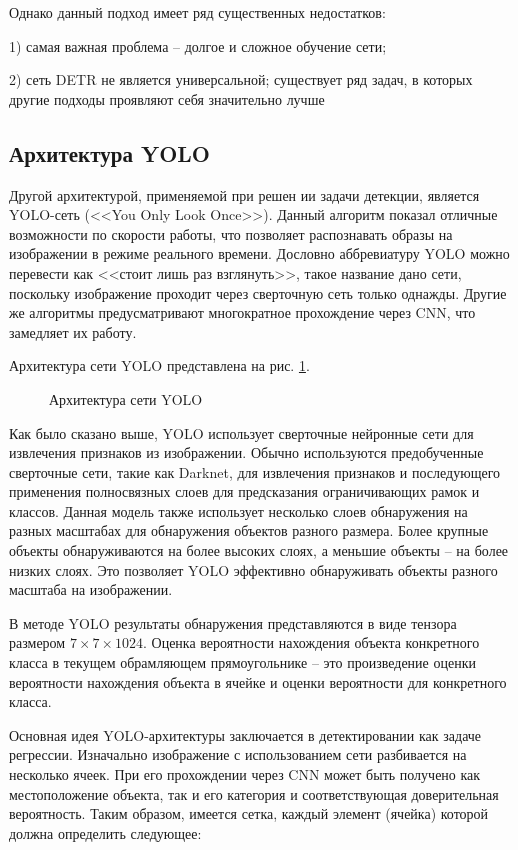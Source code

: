 \documentclass[14pt,a4paper]{extarticle}
\begin{document}
Однако данный подход имеет ряд существенных недостатков:

1) самая важная проблема -- долгое и сложное обучение сети;

2) сеть DETR не является универсальной; существует ряд задач, в которых другие подходы проявляют себя значительно лучше 

\newpage
\subsection{Архитектура YOLO}
Другой архитектурой, применяемой при решен
ии задачи детекции, является YOLO-сеть (<<You Only Look Once>>). Данный алгоритм показал отличные возможности по скорости работы, что позволяет распознавать образы на изображении в режиме реального времени. Дословно аббревиатуру YOLO можно перевести как <<стоит лишь раз взглянуть>>, такое название дано сети, поскольку изображение проходит через сверточную сеть только однажды. Другие же алгоритмы предусматривают многократное прохождение через CNN, что замедляет их работу. 

Архитектура сети YOLO представлена на рис. \ref{yolo}.
\begin{figure}[h]
\caption{Архитектура сети YOLO} \label{yolo}
\end{figure}

Как было сказано выше, YOLO использует сверточные нейронные сети для извлечения признаков из изображении. Обычно используются предобученные сверточные сети, такие как Darknet, для извлечения признаков и последующего применения полносвязных слоев для предсказания ограничивающих рамок и классов. Данная модель также использует несколько слоев обнаружения на разных масштабах для обнаружения объектов разного размера. Более крупные объекты обнаруживаются на более высоких слоях, а меньшие объекты -- на более низких слоях. Это позволяет YOLO эффективно обнаруживать объекты разного масштаба на изображении.

В методе YOLO результаты обнаружения представляются в виде тензора размером $7\times 7 \times 1024$. Оценка вероятности нахождения объекта конкретного класса в
текущем обрамляющем прямоугольнике -- это произведение оценки вероятности нахождения объекта в ячейке и оценки вероятности для конкретного класса.


Основная идея YOLO-архитектуры заключается в детектировании как задаче регрессии. Изначально изображение с использованием сети разбивается на несколько ячеек. При его прохождении через CNN может быть получено как местоположение объекта, так и его категория и соответствующая доверительная вероятность. Таким образом, имеется сетка, каждый элемент (ячейка) которой должна определить следующее:
\end{document}
